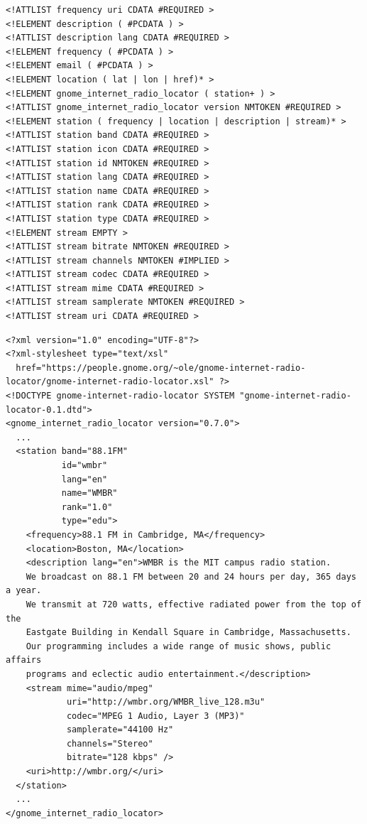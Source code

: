 \documentclass[20pt,landscape]{foils}
\begin{document}

\begin{tiny}
\begin{verbatim}
<!ATTLIST frequency uri CDATA #REQUIRED >
<!ELEMENT description ( #PCDATA ) >
<!ATTLIST description lang CDATA #REQUIRED >
<!ELEMENT frequency ( #PCDATA ) >
<!ELEMENT email ( #PCDATA ) >
<!ELEMENT location ( lat | lon | href)* >
<!ELEMENT gnome_internet_radio_locator ( station+ ) >
<!ATTLIST gnome_internet_radio_locator version NMTOKEN #REQUIRED >
<!ELEMENT station ( frequency | location | description | stream)* >
<!ATTLIST station band CDATA #REQUIRED >
<!ATTLIST station icon CDATA #REQUIRED >
<!ATTLIST station id NMTOKEN #REQUIRED >
<!ATTLIST station lang CDATA #REQUIRED >
<!ATTLIST station name CDATA #REQUIRED >
<!ATTLIST station rank CDATA #REQUIRED >
<!ATTLIST station type CDATA #REQUIRED >
<!ELEMENT stream EMPTY >
<!ATTLIST stream bitrate NMTOKEN #REQUIRED >
<!ATTLIST stream channels NMTOKEN #IMPLIED >
<!ATTLIST stream codec CDATA #REQUIRED >
<!ATTLIST stream mime CDATA #REQUIRED >
<!ATTLIST stream samplerate NMTOKEN #REQUIRED >
<!ATTLIST stream uri CDATA #REQUIRED >
\end{verbatim}
\end{tiny}


\begin{tiny}
\begin{verbatim}
<?xml version="1.0" encoding="UTF-8"?>
<?xml-stylesheet type="text/xsl"
  href="https://people.gnome.org/~ole/gnome-internet-radio-locator/gnome-internet-radio-locator.xsl" ?>
<!DOCTYPE gnome-internet-radio-locator SYSTEM "gnome-internet-radio-locator-0.1.dtd">
<gnome_internet_radio_locator version="0.7.0">
  ...
  <station band="88.1FM"
           id="wmbr"
           lang="en"
           name="WMBR"
           rank="1.0"
           type="edu">
    <frequency>88.1 FM in Cambridge, MA</frequency>
    <location>Boston, MA</location>
    <description lang="en">WMBR is the MIT campus radio station.
    We broadcast on 88.1 FM between 20 and 24 hours per day, 365 days a year.
    We transmit at 720 watts, effective radiated power from the top of the
    Eastgate Building in Kendall Square in Cambridge, Massachusetts.
    Our programming includes a wide range of music shows, public affairs
    programs and eclectic audio entertainment.</description>
    <stream mime="audio/mpeg"
            uri="http://wmbr.org/WMBR_live_128.m3u"
            codec="MPEG 1 Audio, Layer 3 (MP3)"
            samplerate="44100 Hz"
            channels="Stereo"
            bitrate="128 kbps" />
    <uri>http://wmbr.org/</uri>
  </station>
  ...
</gnome_internet_radio_locator>
\end{verbatim}
\end{tiny}
\end{document}
